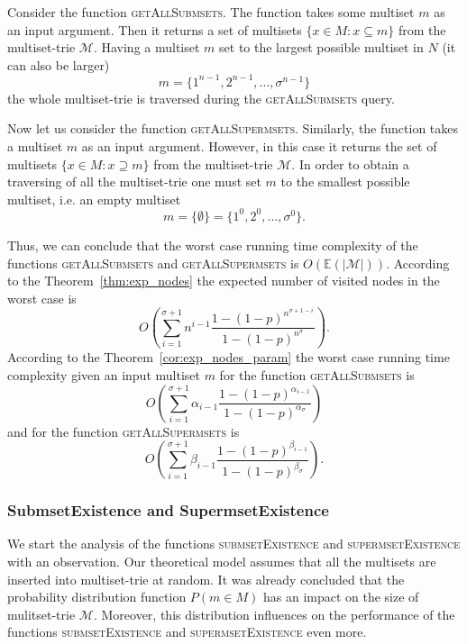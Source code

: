 Consider the function \textsc{getAllSubmsets}. The function takes some multiset 
$m$ as an input argument. Then it returns a set of multisets $\{x\in M : x\subseteq m \}$ 
from the multiset-trie $\mathcal{M}$. Having a multiset $m$ set to the largest 
possible multiset in $N$ (it can also be larger) 
\[
m = \{ 1^{n-1},2^{n-1},\ldots, \sigma^{n-1} \}
\]
the whole multiset-trie is traversed during the \textsc{getAllSubmsets} query.

Now let us consider the function \textsc{getAllSupermsets}. Similarly, the function 
takes a multiset $m$ as an input argument. However, in this case it returns the 
set of multisets $\{ x\in M : x\supseteq m \}$ from the multiset-trie 
$\mathcal{M}.$ In order to obtain a traversing of all the multiset-trie one must set 
$m$ to the smallest possible multiset, i.e. an empty multiset
\begin{equation*}
m = \{ \emptyset \} = \{ 1^0,2^0, \ldots, \sigma^0 \}.
\end{equation*}

Thus, we can conclude that the worst case running time complexity of the 
functions \textsc{getAllSubmsets} and \textsc{getAllSupermsets} is $O(\mathbb{E}( |\mathcal{M}| )).$ 
According to the Theorem~\ref{thm:exp_nodes} the expected number of visited 
nodes in the worst case is 
\begin{equation*}
O(\sum_{i=1}^{\sigma+1} n^{i-1} \frac{1-(1-p)^{n^{\sigma +1 -i}}}{1-(1-p)^{n^{\sigma}}}).
\end{equation*}
According to the Theorem~\ref{cor:exp_nodes_param} the worst case running 
time complexity given an input multiset $m$ for the function \textsc{getAllSubmsets} is 
\begin{equation*}
O(\sum_{i=1}^{\sigma + 1} \alpha_{i-1} \frac{1-(1-p)^{\alpha_{i-1}}}{1-(1-p)^{\alpha_{\sigma}}})
\end{equation*}
and for the function \textsc{getAllSupermsets} is 
\begin{equation*}
O(\sum_{i=1}^{\sigma + 1} \beta_{i-1} \frac{1-(1-p)^{\beta_{i-1}}}{1-(1-p)^{\beta_{\sigma}}}).
\end{equation*}


\subsubsection{SubmsetExistence and SupermsetExistence}\label{ss:exists}
We start the analysis of the functions \textsc{submsetExistence} and 
\textsc{supermsetExistence} with an observation. Our theoretical model assumes 
that all the multisets are inserted into multiset-trie at random. It was already concluded 
that the probability distribution function $P(m\in M)$ has an impact on the size of 
mulitset-trie $\mathcal{M}.$ Moreover, this distribution influences on the performance 
of the functions \textsc{submsetExistence} and \textsc{supermsetExistence} even more. 

